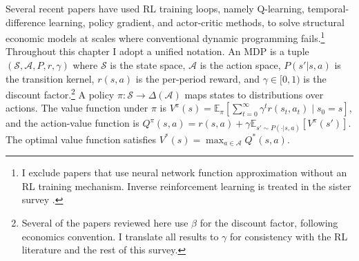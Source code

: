 Several recent papers have used RL training loops, namely Q-learning, temporal-difference learning, policy gradient, and actor-critic methods, to solve structural economic models at scales where conventional dynamic programming fails.\footnote{I exclude papers that use neural network function approximation without an RL training mechanism. Inverse reinforcement learning is treated in the sister survey \citep{RustRawat2026}.} Throughout this chapter I adopt a unified notation. An MDP is a tuple $(\mathcal{S}, \mathcal{A}, P, r, \gamma)$ where $\mathcal{S}$ is the state space, $\mathcal{A}$ is the action space, $P(s' | s, a)$ is the transition kernel, $r(s,a)$ is the per-period reward, and $\gamma \in [0,1)$ is the discount factor.\footnote{Several of the papers reviewed here use $\beta$ for the discount factor, following economics convention. I translate all results to $\gamma$ for consistency with the RL literature and the rest of this survey.} A policy $\pi: \mathcal{S} \to \Delta(\mathcal{A})$ maps states to distributions over actions. The value function under $\pi$ is $V^\pi(s) = \mathbb{E}_\pi\left[\sum_{t=0}^\infty \gamma^t r(s_t, a_t) \mid s_0 = s\right]$, and the action-value function is $Q^\pi(s,a) = r(s,a) + \gamma \mathbb{E}_{s' \sim P(\cdot|s,a)}[V^\pi(s')]$. The optimal value function satisfies $V^*(s) = \max_{a \in \mathcal{A}} Q^*(s,a)$.




